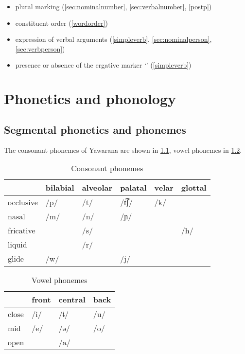 \documentclass{memoir}
\begin{document}
\begin{itemize}
\tightlist
\item
  plural marking (\cref{sec:nominalnumber}, \cref{sec:verbalnumber},
  \cref{postp})
\item
  constituent order (\cref{wordorder})
\item
  expression of verbal arguments (\cref{simpleverb},
  \cref{sec:nominalperson}, \cref{sec:verbperson})
\item
  presence or absence of the ergative marker  `'
  (\cref{simpleverb})
\end{itemize}

\chapter{\texorpdfstring{Phonetics and phonology
\label{phono}}{Phonetics and phonology }}

\section{\texorpdfstring{Segmental phonetics and phonemes
\label{sec:segmental}}{Segmental phonetics and phonemes }}

The consonant phonemes of Yawarana are shown in \cref{tab:consonants},
vowel phonemes in \cref{tab:vowels}.

\begin{table}[h]
\caption{Consonant phonemes}
\label{tab:consonants}
\centering
\begin{tabular}{llllll}
\toprule
          & bilabial & alveolar & palatal & velar & glottal \\
\midrule
occlusive &     /p/  &     /t/  &  /t͡ʃ/  &   /k/ &         \\
    nasal &     /m/  &     /n/  &    /ɲ/  &       &         \\
fricative &          &     /s/  &         &       &    /h/  \\
   liquid &          &     /r/  &         &       &         \\
    glide &     /w/  &          &     /j/ &       &         \\
\bottomrule
\end{tabular}

\end{table}

\begin{table}[h]
\caption{Vowel phonemes}
\label{tab:vowels}
\centering
\begin{tabular}{llll}
\toprule
      & front & central & back \\
\midrule
close &  /i/  &    /ɨ/  & /u/  \\
  mid &  /e/  &    /ə/  & /o/  \\
 open &       &    /a/  &      \\
\bottomrule
\end{tabular}

\end{table}
\end{document}
